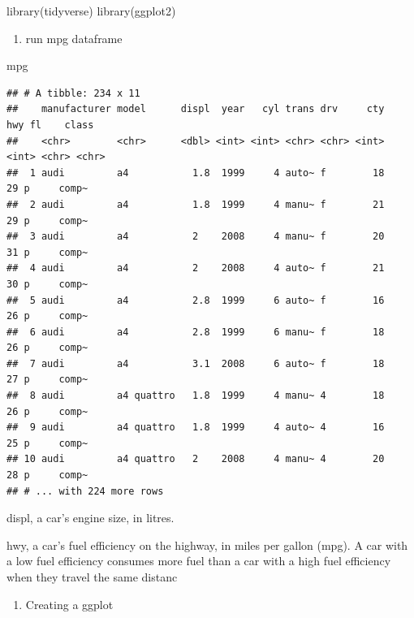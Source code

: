 \documentclass[
]{article}
\newenvironment{Shaded}{\begin{snugshade}}{\end{snugshade}}
\newcommand{\FunctionTok}[1]{\textcolor[rgb]{0.00,0.00,0.00}{#1}}
\newcommand{\NormalTok}[1]{#1}
\providecommand{\tightlist}{%
  \setlength{\itemsep}{0pt}\setlength{\parskip}{0pt}}
\begin{document}
\begin{Shaded}
\begin{Highlighting}[]
\FunctionTok{library}\NormalTok{(tidyverse)}
\FunctionTok{library}\NormalTok{(ggplot2)}
\end{Highlighting}
\end{Shaded}

\begin{enumerate}
\def\labelenumi{\arabic{enumi}.}
\setcounter{enumi}{1}
\tightlist
\item
  run mpg dataframe
\end{enumerate}

\begin{Shaded}
\begin{Highlighting}[]
\NormalTok{mpg}
\end{Highlighting}
\end{Shaded}

\begin{verbatim}
## # A tibble: 234 x 11
##    manufacturer model      displ  year   cyl trans drv     cty   hwy fl    class
##    <chr>        <chr>      <dbl> <int> <int> <chr> <chr> <int> <int> <chr> <chr>
##  1 audi         a4           1.8  1999     4 auto~ f        18    29 p     comp~
##  2 audi         a4           1.8  1999     4 manu~ f        21    29 p     comp~
##  3 audi         a4           2    2008     4 manu~ f        20    31 p     comp~
##  4 audi         a4           2    2008     4 auto~ f        21    30 p     comp~
##  5 audi         a4           2.8  1999     6 auto~ f        16    26 p     comp~
##  6 audi         a4           2.8  1999     6 manu~ f        18    26 p     comp~
##  7 audi         a4           3.1  2008     6 auto~ f        18    27 p     comp~
##  8 audi         a4 quattro   1.8  1999     4 manu~ 4        18    26 p     comp~
##  9 audi         a4 quattro   1.8  1999     4 auto~ 4        16    25 p     comp~
## 10 audi         a4 quattro   2    2008     4 manu~ 4        20    28 p     comp~
## # ... with 224 more rows
\end{verbatim}

displ, a car's engine size, in litres.

hwy, a car's fuel efficiency on the highway, in miles per gallon (mpg).
A car with a low fuel efficiency consumes more fuel than a car with a
high fuel efficiency when they travel the same distanc

\begin{enumerate}
\def\labelenumi{\arabic{enumi}.}
\setcounter{enumi}{2}
\tightlist
\item
  Creating a ggplot
\end{enumerate}
\end{document}
